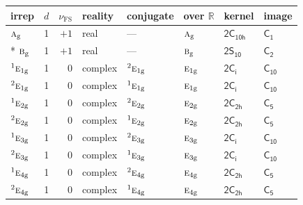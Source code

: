 \documentclass[10pt,a4paper]{article}
\numberwithin{equation}{section}
\newcommand{\grp}[1]{\mathsf{#1}}
\newcommand{\irr}[1]{\text{\normalfont\scshape #1}}
\newcommand{\conjpair}[1]{{}^{#1}}
\newcommand{\ptag}[1]{\mathrm{#1}}
\newcommand{\fsind}{\nu_{\mathrm{FS}}}
\begin{document}
{\small\renewcommand{\arraystretch}{1.25}\setlength{\tabcolsep}{4pt}\begin{longtable}{@{}lrrlllll@{}}\toprule
irrep & $d$ & $\fsind$ & reality & conjugate & over $\mathbb{R}$ & kernel & image\\\midrule\endhead
\bottomrule\endfoot\endlastfoot
$\irr{a}_{\ptag{g}}$ & 1 & $+1$ & real & --- & $\irr{a}_{\ptag{g}}$ & \href{2C10h.pdf}{$\grp{2C_{10h}}$} & \href{../../../rotation/data/pdf/C1.pdf}{$\grp{C_{1}}$}\\*
$\irr{b}_{\ptag{g}}$ & 1 & $+1$ & real & --- & $\irr{b}_{\ptag{g}}$ & \href{2S10.pdf}{$\grp{2S_{10}}$} & \href{../../../rotation/data/pdf/C2.pdf}{$\grp{C_{2}}$}\\
$\conjpair{1}\irr{e}_{1\ptag{g}}$ & 1 & $0$ & complex & $\conjpair{2}\irr{e}_{1\ptag{g}}$ & $\irr{e}_{1\ptag{g}}$ & \href{2S2.pdf}{$\grp{2C_{i}}$} & \href{../../../rotation/data/pdf/C10.pdf}{$\grp{C_{10}}$}\\
$\conjpair{2}\irr{e}_{1\ptag{g}}$ & 1 & $0$ & complex & $\conjpair{1}\irr{e}_{1\ptag{g}}$ & $\irr{e}_{1\ptag{g}}$ & \href{2S2.pdf}{$\grp{2C_{i}}$} & \href{../../../rotation/data/pdf/C10.pdf}{$\grp{C_{10}}$}\\
$\conjpair{1}\irr{e}_{2\ptag{g}}$ & 1 & $0$ & complex & $\conjpair{2}\irr{e}_{2\ptag{g}}$ & $\irr{e}_{2\ptag{g}}$ & \href{2C2h.pdf}{$\grp{2C_{2h}}$} & \href{../../../rotation/data/pdf/C5.pdf}{$\grp{C_{5}}$}\\
$\conjpair{2}\irr{e}_{2\ptag{g}}$ & 1 & $0$ & complex & $\conjpair{1}\irr{e}_{2\ptag{g}}$ & $\irr{e}_{2\ptag{g}}$ & \href{2C2h.pdf}{$\grp{2C_{2h}}$} & \href{../../../rotation/data/pdf/C5.pdf}{$\grp{C_{5}}$}\\
$\conjpair{1}\irr{e}_{3\ptag{g}}$ & 1 & $0$ & complex & $\conjpair{2}\irr{e}_{3\ptag{g}}$ & $\irr{e}_{3\ptag{g}}$ & \href{2S2.pdf}{$\grp{2C_{i}}$} & \href{../../../rotation/data/pdf/C10.pdf}{$\grp{C_{10}}$}\\
$\conjpair{2}\irr{e}_{3\ptag{g}}$ & 1 & $0$ & complex & $\conjpair{1}\irr{e}_{3\ptag{g}}$ & $\irr{e}_{3\ptag{g}}$ & \href{2S2.pdf}{$\grp{2C_{i}}$} & \href{../../../rotation/data/pdf/C10.pdf}{$\grp{C_{10}}$}\\
$\conjpair{1}\irr{e}_{4\ptag{g}}$ & 1 & $0$ & complex & $\conjpair{2}\irr{e}_{4\ptag{g}}$ & $\irr{e}_{4\ptag{g}}$ & \href{2C2h.pdf}{$\grp{2C_{2h}}$} & \href{../../../rotation/data/pdf/C5.pdf}{$\grp{C_{5}}$}\\
$\conjpair{2}\irr{e}_{4\ptag{g}}$ & 1 & $0$ & complex & $\conjpair{1}\irr{e}_{4\ptag{g}}$ & $\irr{e}_{4\ptag{g}}$ & \href{2C2h.pdf}{$\grp{2C_{2h}}$} & \href{../../../rotation/data/pdf/C5.pdf}{$\grp{C_{5}}$}\\

\end{longtable}}
\end{document}

